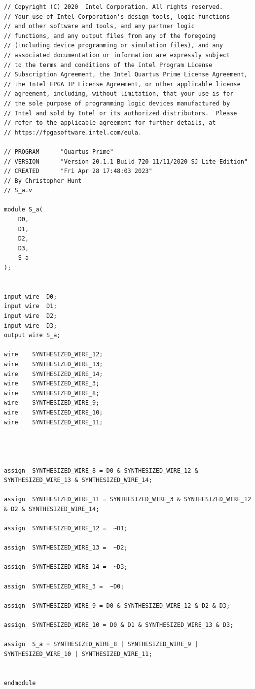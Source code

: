 \documentclass{article}
\begin{document}
\begin{lstlisting}
// Copyright (C) 2020  Intel Corporation. All rights reserved.
// Your use of Intel Corporation's design tools, logic functions 
// and other software and tools, and any partner logic 
// functions, and any output files from any of the foregoing 
// (including device programming or simulation files), and any 
// associated documentation or information are expressly subject 
// to the terms and conditions of the Intel Program License 
// Subscription Agreement, the Intel Quartus Prime License Agreement,
// the Intel FPGA IP License Agreement, or other applicable license
// agreement, including, without limitation, that your use is for
// the sole purpose of programming logic devices manufactured by
// Intel and sold by Intel or its authorized distributors.  Please
// refer to the applicable agreement for further details, at
// https://fpgasoftware.intel.com/eula.

// PROGRAM		"Quartus Prime"
// VERSION		"Version 20.1.1 Build 720 11/11/2020 SJ Lite Edition"
// CREATED		"Fri Apr 28 17:48:03 2023"
// By Christopher Hunt 
// S_a.v

module S_a(
	D0,
	D1,
	D2,
	D3,
	S_a
);


input wire	D0;
input wire	D1;
input wire	D2;
input wire	D3;
output wire	S_a;

wire	SYNTHESIZED_WIRE_12;
wire	SYNTHESIZED_WIRE_13;
wire	SYNTHESIZED_WIRE_14;
wire	SYNTHESIZED_WIRE_3;
wire	SYNTHESIZED_WIRE_8;
wire	SYNTHESIZED_WIRE_9;
wire	SYNTHESIZED_WIRE_10;
wire	SYNTHESIZED_WIRE_11;




assign	SYNTHESIZED_WIRE_8 = D0 & SYNTHESIZED_WIRE_12 & SYNTHESIZED_WIRE_13 & SYNTHESIZED_WIRE_14;

assign	SYNTHESIZED_WIRE_11 = SYNTHESIZED_WIRE_3 & SYNTHESIZED_WIRE_12 & D2 & SYNTHESIZED_WIRE_14;

assign	SYNTHESIZED_WIRE_12 =  ~D1;

assign	SYNTHESIZED_WIRE_13 =  ~D2;

assign	SYNTHESIZED_WIRE_14 =  ~D3;

assign	SYNTHESIZED_WIRE_3 =  ~D0;

assign	SYNTHESIZED_WIRE_9 = D0 & SYNTHESIZED_WIRE_12 & D2 & D3;

assign	SYNTHESIZED_WIRE_10 = D0 & D1 & SYNTHESIZED_WIRE_13 & D3;

assign	S_a = SYNTHESIZED_WIRE_8 | SYNTHESIZED_WIRE_9 | SYNTHESIZED_WIRE_10 | SYNTHESIZED_WIRE_11;


endmodule
\end{lstlisting}
\end{document}
